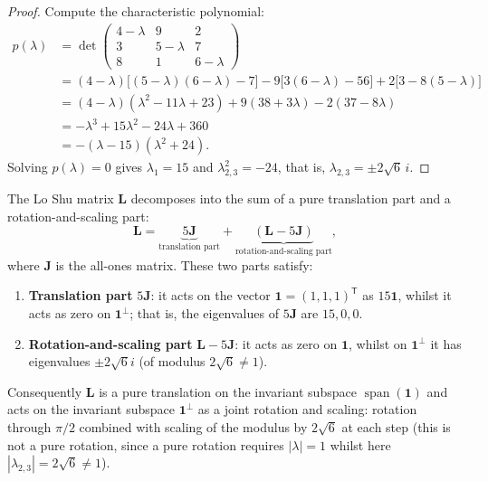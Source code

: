 \begin{proof}
Compute the characteristic polynomial:
\begin{align*}
p(\lambda) &= \det \begin{pmatrix} 4 - \lambda & 9 & 2 \\ 3 & 5 - \lambda & 7 \\ 8 & 1 & 6 - \lambda \end{pmatrix} \\
&= (4 - \lambda)\bigl[(5-\lambda)(6-\lambda) - 7\bigr] - 9\bigl[3(6-\lambda) - 56\bigr] + 2\bigl[3 - 8(5-\lambda)\bigr] \\
&= (4-\lambda)(\lambda^2 - 11\lambda + 23) + 9(38 + 3\lambda) - 2(37 - 8\lambda) \\
&= -\lambda^3 + 15\lambda^2 - 24\lambda + 360 \\
&= -(\lambda - 15)(\lambda^2 + 24).
\end{align*}
Solving $p(\lambda) = 0$ gives $\lambda_1 = 15$ and $\lambda_{2,3}^2 = -24$, that is, $\lambda_{2,3} = \pm 2\sqrt{6}\, i$.
\end{proof}

\begin{theorem}\label{thm:luoshu_decomposition}
The Lo Shu matrix $\mathbf{L}$ decomposes into the sum of a pure translation part and a rotation-and-scaling part:
\[
\mathbf{L} = \underbrace{5\mathbf{J}}_{\text{translation part}} + \underbrace{(\mathbf{L} - 5\mathbf{J})}_{\text{rotation-and-scaling part}},
\]
where $\mathbf{J}$ is the all-ones matrix. These two parts satisfy:
\begin{enumerate}[label=(\roman*)]
    \item \textbf{Translation part} $5\mathbf{J}$: it acts on the vector $\mathbf{1} = (1,1,1)^{\mathsf T}$ as $15\mathbf{1}$, whilst it acts as zero on $\mathbf{1}^\perp$; that is, the eigenvalues of $5\mathbf{J}$ are $15, 0, 0$.
    \item \textbf{Rotation-and-scaling part} $\mathbf{L} - 5\mathbf{J}$: it acts as zero on $\mathbf{1}$, whilst on $\mathbf{1}^\perp$ it has eigenvalues $\pm 2\sqrt{6}i$ (of modulus $2\sqrt{6}\ne1$).
\end{enumerate}
Consequently $\mathbf{L}$ is a pure translation on the invariant subspace $\operatorname{span}(\mathbf{1})$ and acts on the invariant subspace $\mathbf{1}^\perp$ as a joint rotation and scaling: rotation through $\pi/2$ combined with scaling of the modulus by $2\sqrt{6}$ at each step (this is not a pure rotation, since a pure rotation requires $|\lambda|=1$ whilst here $|\lambda_{2,3}|=2\sqrt{6}\ne1$).
\end{theorem}

